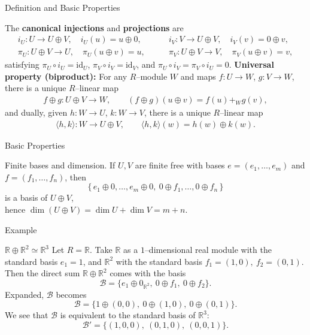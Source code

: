 \begin{frame}{Definition and Basic Properties}
\begin{block}{}
The \textbf{canonical injections} and \textbf{projections} are
\small\begin{align*}
i_U:U\to U\oplus V,\quad i_U(u)=u\oplus 0, \qquad &
i_V:V\to U\oplus V,\quad i_V(v)=0\oplus v,\\
\pi_U:U\oplus V\to U,\quad \pi_U(u\oplus v)=u, \qquad &
\pi_V:U\oplus V\to V,\quad \pi_V(u\oplus v)=v,
\end{align*}
satisfying $\pi_U\circ i_U=\mathrm{id}_U$, $\pi_V\circ i_V=\mathrm{id}_V$, and $\pi_U\circ i_V=\pi_V\circ i_U=0$.
\textbf{Universal property (biproduct):} For any $R$–module $W$ and maps $f:U\to W$, $g:V\to W$, there is a unique $R$–linear map
\begin{align*}
f\oplus g:U\oplus V\to W,\qquad (f\oplus g)(u\oplus v)=f(u)+_W g(v),
\end{align*}
and dually, given $h:W\to U$, $k:W\to V$, there is a unique $R$–linear map
\begin{align*}
\langle h,k\rangle:W\to U\oplus V,\qquad \langle h,k\rangle(w)=h(w)\oplus k(w).
\end{align*}
\end{block}
\end{frame}

\begin{frame}{Basic Properties}
\begin{block}{Finite bases and dimension.} If $U,V$ are finite free with bases $e=(e_1,\dots,e_m)$ and $f=(f_1,\dots,f_n)$, then
\[
\{\,e_1\oplus 0,\dots, e_m\oplus 0,\ 0\oplus f_1,\dots,0\oplus f_n\,\}
\]
is a basis of $U\oplus V$, \\
hence $\dim(U\oplus V)=\dim U+\dim V=m+n$.
\end{block}
\end{frame}

\begin{frame}{Example}
\vspace{-0.3cm}
\begin{block}{$\mathbb{R} \oplus \mathbb{R}^2 \simeq \mathbb{R}^3$}
Let $R=\mathbb{R}$.
Take $\mathbb{R}$ as a $1$–dimensional real module with the standard basis $e_1 = 1$,
and $\mathbb{R}^2$ with the standard basis $f_1 = (1, 0),\ f_2 = (0, 1).$
Then the direct sum $\mathbb{R} \oplus \mathbb{R}^2$ comes with the basis
\[
\mathcal{B} = \{e_1 \oplus 0_{\mathbb{R}^2},\ 0 \oplus f_1,\ 0 \oplus f_2\}.
\]
Expanded, $\mathcal{B}$ becomes
\[
\mathcal{B} = \{1 \oplus (0, 0),\ 0 \oplus (1, 0),\ 0 \oplus (0, 1)\}.
\]
We see that $\mathcal{B}$ is equivalent to the standard basis of $\mathbb{R}^3$:
\[
\mathcal{B}' = \{(1, 0, 0),\ (0, 1, 0),\ (0, 0, 1)\}.
\]
\end{block}
\end{frame}

